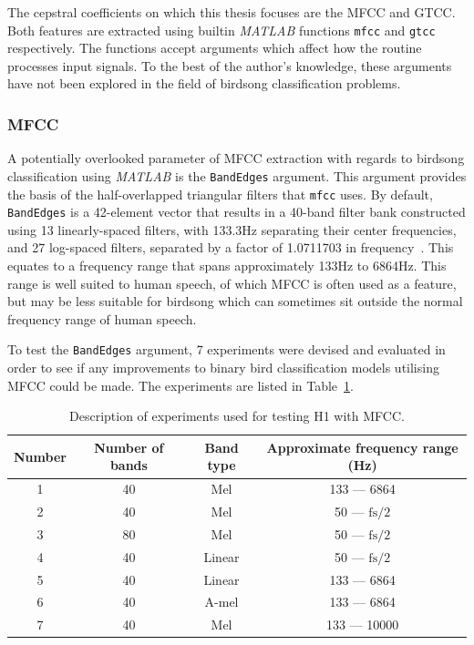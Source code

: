 The cepstral coefficients on which this thesis focuses are the MFCC and GTCC\@.
Both features are extracted using builtin \textit{MATLAB} functions
\texttt{mfcc} and \texttt{gtcc} respectively. The functions accept arguments
which affect how the routine processes input signals. To the best of the
author's knowledge, these arguments have not been explored in the field of
birdsong classification problems.

\subsubsection{MFCC}\label{sssec:mfcc}

A potentially overlooked parameter of MFCC extraction with regards to birdsong
classification using \textit{MATLAB} is the \texttt{BandEdges} argument. This
argument provides the basis of the half-overlapped triangular filters that
\texttt{mfcc} uses. By default, \texttt{BandEdges} is a 42-element vector that
results in a 40-band filter bank constructed using 13 linearly-spaced filters,
with 133.3Hz separating their center frequencies, and 27 log-spaced filters,
separated by a factor of 1.0711703 in frequency~\cite{slaney1998auditory}. This
equates to a frequency range that spans approximately 133Hz to 6864Hz. This
range is well suited to human speech, of which MFCC is often used as a feature,
but may be less suitable for birdsong which can sometimes sit outside the normal
frequency range of human speech.

To test the \texttt{BandEdges} argument, 7 experiments were devised and
evaluated in order to see if any improvements to binary bird classification
models utilising MFCC could be made. The experiments are listed in
Table~\ref{table:h1_mfcc_experiments}.

\begin{table}[ht]
\begin{center}
\begin{tabular}{c c c c}
\toprule
Number & Number of bands & Band type & Approximate frequency range (Hz) \\ [0.5ex]
\midrule
1 & 40 & Mel & 133 --- 6864 \\
2 & 40 & Mel & 50 --- $\text{fs}/2$ \\
3 & 80 & Mel & 50 --- $\text{fs}/2$ \\
4 & 40 & Linear & 50 --- $\text{fs}/2$ \\
5 & 40 & Linear & 133 --- 6864 \\
6 & 40 & A-mel & 133 --- 6864 \\
7 & 40 & Mel & 133 --- 10000 \\
\bottomrule
\end{tabular}
\caption{Description of experiments used for testing H1 with
MFCC.}\label{table:h1_mfcc_experiments}
\end{center}
\end{table}

